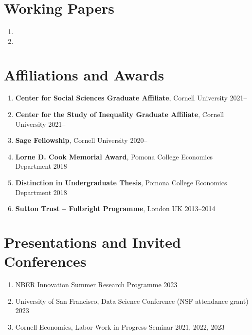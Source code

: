 \documentclass[letterpaper,11pt,oneside]{article}
\begin{document}

\section*{Working Papers}
\begin{enumerate}[itemsep=2.5pt, label={}]
    \item {}
    \item {}
\end{enumerate}


\section*{Affiliations and Awards}
\begin{enumerate}[itemsep=2pt, label={}]
    \item \textbf{Center for Social Sciences Graduate Affiliate}, Cornell University \hfill 2021--
    \item \textbf{Center for the Study of Inequality Graduate Affiliate}, Cornell University \hfill 2021--
    \item \textbf{Sage Fellowship}, Cornell University \hfill 2020--
    \item \textbf{Lorne D. Cook Memorial Award}, Pomona College Economics Department \hfill 2018
    \item \textbf{Distinction in Undergraduate Thesis}, Pomona College Economics Department \hfill 2018
    \item \textbf{Sutton Trust -- Fulbright Programme}, London UK \hfill 2013--2014
\end{enumerate}

\section*{Presentations and Invited Conferences}
\begin{enumerate}[itemsep=2pt, label={}]
    \item NBER Innovation Summer Research Programme \hfill 2023
    \item University of San Francisco, Data Science Conference (NSF attendance grant) \hfill 2023
    \item Cornell Economics, Labor Work in Progress Seminar \hfill 2021, 2022, 2023
\end{enumerate}
\end{document}
